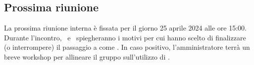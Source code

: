 \subsection{Prossima riunione}
La prossima riunione interna è fissata per il giorno 25 aprile 2024 alle ore 15:00. Durante l'incontro, \riccardo\ e \mattia\ spiegheranno i motivi per cui hanno scelto di finalizzare (o interrompere) il passaggio a  come . In caso positivo, l'amministratore terrà un breve workshop per allineare il gruppo sull'utilizzo di .